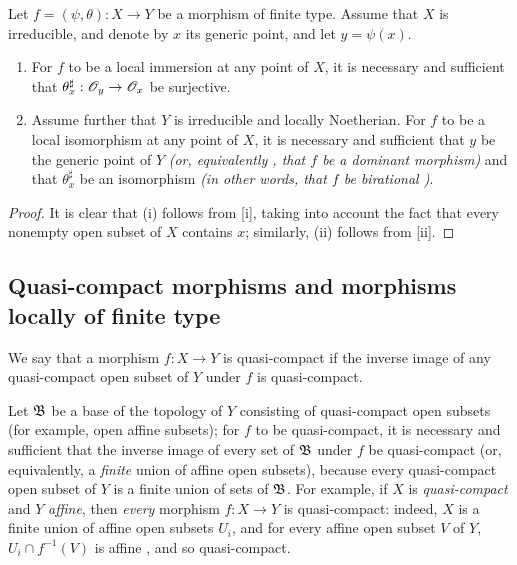 \begin{cor}[6.5.5]
\label{1.6.5.5}
Let $f=(\psi,\theta):X\to Y$ be a morphism of finite type.
Assume that $X$ is irreducible, and denote by $x$ its generic point, and let $y=\psi(x)$.
\begin{enumerate}[label=\emph{(\roman*)}]
  \item For $f$ to be a local immersion at any point of $X$, it is necessary and sufficient that $\theta_x^\sharp:\mathscr{O}_y\to\mathscr{O}_x$ be surjective.
  \item Assume further that $Y$ is irreducible and locally Noetherian.
    For $f$ to be a local isomorphism at any point of $X$, it is necessary and sufficient that $y$ be the generic point of $Y$ \emph{(or, equivalently , that $f$ be a \emph{dominant} morphism)} and that $\theta_x^\sharp$ be an isomorphism \emph{(in other words, that $f$ be \emph{birational} )}.
\end{enumerate}
\end{cor}

\begin{proof}
\label{proof-1.6.5.5}
It is clear that (i) follows from [i], taking into account the fact that every nonempty open subset of $X$ contains $x$;
similarly, (ii) follows from [ii].
\end{proof}

\subsection{Quasi-compact morphisms and morphisms locally of finite type}
\label{subsection-quasi-compact-morphisms-and-morphisms-locally-of-finite-type}

\begin{defn}[6.6.1]
\label{1.6.6.1}
We say that a morphism $f: X\to Y$ is quasi-compact if the inverse image of any quasi-compact open subset of $Y$ under $f$ is quasi-compact.
\end{defn}

Let $\mathfrak{B}$ be a base of the topology of $Y$ consisting of quasi-compact open subsets (for example, open affine subsets);
for $f$ to be quasi-compact, it is necessary and sufficient that the inverse image of every set of $\mathfrak{B}$ under $f$ be quasi-compact (or, equivalently, a \emph{finite} union of affine open subsets), because every quasi-compact open subset of $Y$ is a finite union of sets of $\mathfrak{B}$.
For example, if $X$ is \emph{quasi-compact} and $Y$ \emph{affine}, then \emph{every} morphism $f: X\to Y$ is quasi-compact:
indeed, $X$ is a finite union of affine open subsets $U_i$, and for every affine open subset $V$ of $Y$, $U_i\cap f^{-1}(V)$ is affine , and so quasi-compact.

